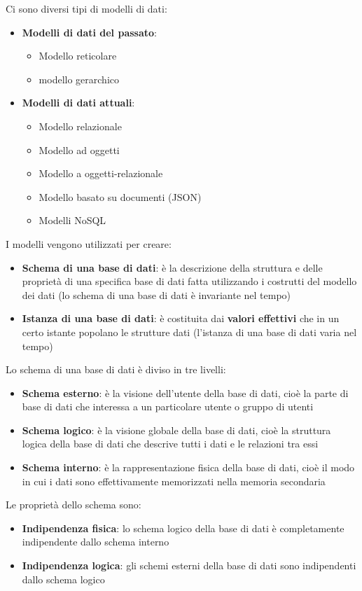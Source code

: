 \documentclass[a4paper,twoside]{article}
\begin{document}
Ci sono diversi tipi di modelli di dati:
\begin{itemize}
  \item \textbf{Modelli di dati del passato}:
    \begin{itemize}
      \item Modello reticolare
      \item modello gerarchico
    \end{itemize}

  \item \textbf{Modelli di dati attuali}:
    \begin{itemize}
      \item Modello relazionale
      \item Modello ad oggetti
      \item Modello a oggetti-relazionale
      \item Modello basato su documenti (JSON)
      \item Modelli NoSQL
    \end{itemize}
\end{itemize}

I modelli vengono utilizzati per creare:
\begin{itemize}
  \item \textbf{Schema di una base di dati}: è la descrizione della struttura e delle
    proprietà di una specifica base di dati fatta utilizzando i costrutti del modello dei
    dati (lo schema di una base di dati è invariante nel tempo)
  \item \textbf{Istanza di una base di dati}: è costituita dai \textbf{valori effettivi}
    che in un certo istante popolano le strutture dati (l'istanza di una base di dati
    varia nel tempo)
\end{itemize}

Lo schema di una base di dati è diviso in tre livelli:
\begin{itemize}
  \item \textbf{Schema esterno}: è la visione dell'utente della base di dati, cioè la
    parte di base di dati che interessa a un particolare utente o gruppo di utenti
  \item \textbf{Schema logico}: è la visione globale della base di dati, cioè la
    struttura logica della base di dati che descrive tutti i dati e le relazioni tra
    essi
  \item \textbf{Schema interno}: è la rappresentazione fisica della base di dati, cioè
    il modo in cui i dati sono effettivamente memorizzati nella memoria secondaria
\end{itemize}
Le proprietà dello schema sono:
\begin{itemize}
  \item \textbf{Indipendenza fisica}: lo schema logico della base di dati è completamente
    indipendente dallo schema interno
  \item \textbf{Indipendenza logica}: gli schemi esterni della base di dati sono
    indipendenti dallo schema logico
\end{itemize}
\end{document}
